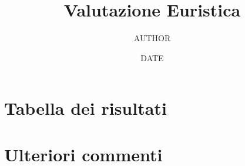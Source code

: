 \documentclass[french]{article}
\title{Valutazione Euristica}
\author{~~AUTHOR~~}
\date{~~DATE~~}
\begin{document}
\maketitle

\section{Tabella dei risultati}



\section{Ulteriori commenti}
\end{document}
